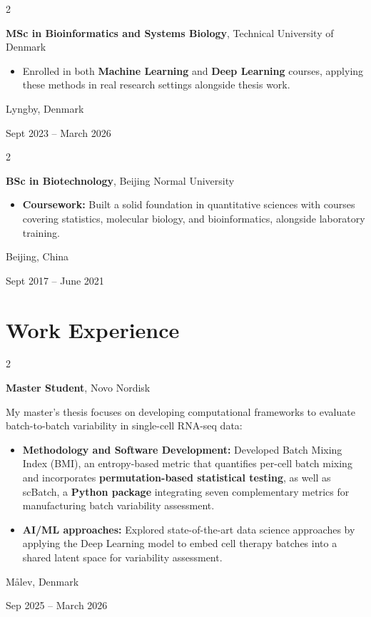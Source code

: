 \documentclass[10pt, letterpaper]{article}
\newenvironment{highlights}{
    \begin{itemize}[
        topsep=0.10 cm,
        parsep=0.10 cm,
        partopsep=0pt,
        itemsep=0pt,
        leftmargin=0.4 cm + 10pt
    ]
}{
    \end{itemize}
}
\newenvironment{twocolentry}[2][]{
    \onecolentry
    \def\secondColumn{#2}
    \setcolumnwidth{\fill, 4.5 cm}
    \begin{paracol}{2}
}{
    \switchcolumn \raggedleft \secondColumn
    \end{paracol}
    \endonecolentry
}
\begin{document}
        \begin{twocolentry}{
    Lyngby, Denmark

    Sept 2023 -- March 2026
}
    \textbf{MSc in Bioinformatics and Systems Biology}, Technical University of Denmark
    \begin{highlights}
        \item Enrolled in both \textbf{Machine Learning} and \textbf{Deep Learning} courses, applying these methods in real research settings alongside thesis work.
    \end{highlights}
\end{twocolentry}

        \vspace{0.3 cm}

\begin{twocolentry}{
    Beijing, China

    Sept 2017 -- June 2021
}
    \textbf{BSc in Biotechnology}, Beijing Normal University
    \begin{highlights}
        \item \textbf{Coursework:} Built a solid foundation in quantitative sciences with courses covering statistics, molecular biology, and bioinformatics, alongside laboratory training.
    \end{highlights}
\end{twocolentry}


    \section{Work Experience}

        \begin{twocolentry}{
    Målev, Denmark

    Sep 2025 -- March 2026
}
    \textbf{Master Student}, Novo Nordisk

    \vspace{0.1cm}

    My master's thesis focuses on developing computational frameworks to evaluate batch-to-batch variability in single-cell RNA-seq data:

    \begin{highlights}

        \item \textbf{Methodology and Software Development:} Developed Batch Mixing Index (BMI), an entropy-based metric that quantifies per-cell batch mixing and incorporates \textbf{permutation-based statistical testing}, as well as scBatch, a \textbf{Python package} integrating seven complementary metrics for manufacturing batch variability assessment.

        \vspace{0.1cm}

        \item \textbf{AI/ML approaches:} Explored state-of-the-art data science approaches by applying the Deep Learning model to embed cell therapy batches into a shared latent space for variability assessment.

    \end{highlights}
\end{twocolentry}
\end{document}

